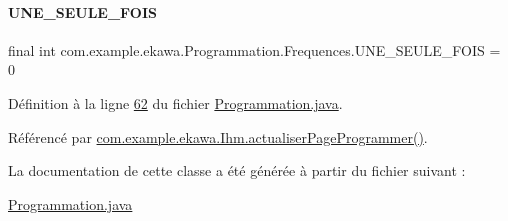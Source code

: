 \paragraph{\texorpdfstring{U\+N\+E\+\_\+\+S\+E\+U\+L\+E\+\_\+\+F\+O\+IS}{UNE\_SEULE\_FOIS}}
{\footnotesize\ttfamily final int com.\+example.\+ekawa.\+Programmation.\+Frequences.\+U\+N\+E\+\_\+\+S\+E\+U\+L\+E\+\_\+\+F\+O\+IS = 0\hspace{0.3cm}{\ttfamily [static]}}



Définition à la ligne \hyperlink{_programmation_8java_source_l00062}{62} du fichier \hyperlink{_programmation_8java_source}{Programmation.\+java}.



Référencé par \hyperlink{_ihm_8java_source_l00938}{com.\+example.\+ekawa.\+Ihm.\+actualiser\+Page\+Programmer()}.



La documentation de cette classe a été générée à partir du fichier suivant \+:\begin{DoxyCompactItemize}
\item 
\hyperlink{_programmation_8java}{Programmation.\+java}\end{DoxyCompactItemize}
